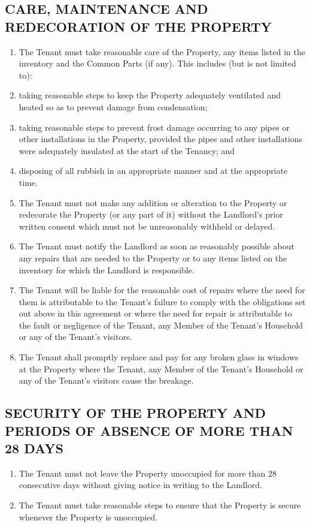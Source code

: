 \subsection{CARE, MAINTENANCE AND REDECORATION OF THE PROPERTY}
\begin{enumerate}
\item{The Tenant must take reasonable care of the Property, any items listed in the inventory and the Common Parts (if any). This includes (but is not limited to):}

\item{taking reasonable steps to keep the Property adequately ventilated and heated so as to prevent damage from condensation;}
\item{taking reasonable steps to prevent frost damage occurring to any pipes or other installations in the Property, provided the pipes and other installations were adequately insulated at the start of the Tenancy; and}
\item{disposing of all rubbish in an appropriate manner and at the appropriate time.}
\item{The Tenant must not make any addition or alteration to the Property or redecorate the Property (or any part of it) without the Landlord's prior written consent which must not be unreasonably withheld or delayed.}

\item{The Tenant must notify the Landlord as soon as reasonably possible about any repairs that are needed to the Property or to any items listed on the inventory for which the Landlord is responsible.}
\item{The Tenant will be liable for the reasonable cost of repairs where the need for them is attributable to the Tenant's failure to comply with the obligations set out above in this agreement or where the need for repair is attributable to the fault or negligence of the Tenant, any Member of the Tenant's Household or any of the Tenant's visitors.}
\item{The Tenant shall promptly replace and pay for any broken glass in windows at the Property where the Tenant, any Member of the Tenant's Household or any of the Tenant's visitors cause the breakage.}
\end{enumerate}

\subsection{SECURITY OF THE PROPERTY AND PERIODS OF ABSENCE OF MORE THAN 28 DAYS}
\begin{enumerate}
\item{The Tenant must not leave the Property unoccupied for more than 28 consecutive days without giving notice in writing to the Landlord.}
\item{The Tenant must take reasonable steps to ensure that the Property is secure whenever the Property is unoccupied.}
\end{enumerate}

